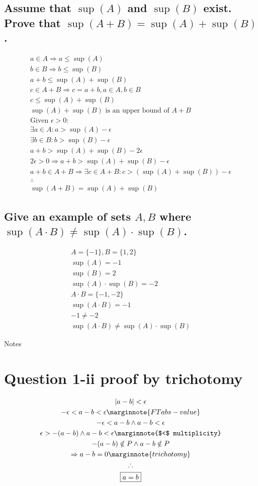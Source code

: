 \documentclass[letterpaper]{article}
\begin{document}
\subsection{Assume that $\sup(A)$ and $\sup(B)$ exist. Prove that $\sup(A+B)=\sup(A)+\sup(B)$.}
\begin{gather*}
a \in A \Rightarrow a \leq \sup(A) \\
b \in B \Rightarrow b \leq \sup(B) \\
a+b\leq\sup(A)+\sup(B) \\
c \in A+B \Rightarrow c=a+b,a\in A,b\in B \\
c\leq\sup(A)+\sup(B) \\
\sup(A)+\sup(B)\text{ is an upper bound of }A+B \\
\text{Given }\epsilon>0: \\
\exists a\in A:a>\sup(A)-\epsilon \\
\exists b\in B:b>\sup(B)-\epsilon \\
a+b>\sup(A)+\sup(B)-2\epsilon \\
2\epsilon>0 \Rightarrow a+b>\sup(A)+\sup(B)-\epsilon \\
a+b\in A+B \Rightarrow \exists c \in A+B:c>(\sup(A)+\sup(B))-\epsilon \\
\therefore \\
\boxed{\sup(A+B)=\sup(A)+\sup(B)}
\end{gather*}
\subsection{Give an example of sets $A,B$ where $\sup(A\cdot B)\neq\sup(A)\cdot\sup(B)$.}
\begin{gather*}
A=\{-1\}, B=\{1,2\} \\
\sup(A)=-1 \\
\sup(B)=2 \\
\sup(A)\cdot\sup(B)=-2 \\
A\cdot B=\{-1, -2\} \\
\sup(A\cdot B)=-1 \\
-1\neq-2 \\
\boxed{\sup(A\cdot B)\neq\sup(A)\cdot\sup(B)}
\end{gather*}
\pagebreak
\setcounter{section}{0}

\begin{center}\Large{Notes}\end{center}

\section{Question 1-ii proof by trichotomy}
\begin{gather*}
|a-b|<\epsilon \\
-\epsilon < a-b < \epsilon \marginnote{FT abs-value} \\
-\epsilon < a-b \land a-b < \epsilon \\
\epsilon > -(a-b) \land a-b < \epsilon \marginnote{$<$ multiplicity} \\
-(a-b) \notin P \land a-b \notin P \\
\Rightarrow a-b=0 \marginnote{trichotomy} \\
\therefore \\
\boxed{a = b}
\end{gather*}
\end{document}
